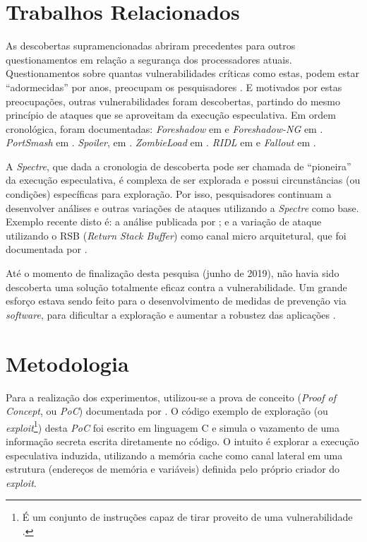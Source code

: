 \documentclass[conference]{IEEEtran}
\begin{document}
\section{Trabalhos Relacionados}
As descobertas supramencionadas abriram precedentes para outros questionamentos em relação a segurança dos processadores atuais. Questionamentos sobre quantas vulnerabilidades críticas como estas, podem estar ``adormecidas'' por anos, preocupam os pesquisadores \cite{Andy2018Triple}. E motivados por estas preocupações, outras vulnerabilidades foram descobertas, partindo do mesmo princípio de ataques que se aproveitam da execução especulativa. Em ordem cronológica, foram documentadas: \emph{Foreshadow} em  e \emph{Foreshadow-NG} em . \emph{PortSmash} em . \emph{Spoiler}, em . \emph{ZombieLoad} em . \emph{RIDL} em  e \emph{Fallout} em .

A \emph{Spectre}, que dada a cronologia de descoberta pode ser chamada de ``pioneira'' da execução especulativa, é complexa de ser explorada e possui circunstâncias (ou condições) específicas para exploração. Por isso, pesquisadores continuam a desenvolver análises e outras variações de ataques utilizando a \emph{Spectre} como base. Exemplo recente disto é: a análise publicada por ; e a variação de ataque utilizando o RSB (\emph{Return Stack Buffer}) como canal micro arquitetural, que foi documentada por .

Até o momento de finalização desta pesquisa (junho de 2019), não havia sido descoberta uma solução totalmente eficaz contra a vulnerabilidade. Um grande esforço estava sendo feito para o desenvolvimento de medidas de prevenção via \emph{software}, para dificultar a exploração e aumentar a robustez das aplicações \cite{Graz2018Meltdown}.

\section{Metodologia}
Para a realização dos experimentos, utilizou-se a prova de conceito (\emph{Proof of Concept}, ou \emph{PoC}) documentada por . O código exemplo de exploração (ou \emph{exploit}\footnote{É um conjunto de instruções \cite{Cruz2016Estudo} capaz de tirar proveito de uma vulnerabilidade \cite{Cambridge2019Exploit}.}) desta \emph{PoC} foi escrito em linguagem C e simula o vazamento de uma informação secreta escrita diretamente no código. O intuito é explorar a execução especulativa induzida, utilizando a memória cache como canal lateral em uma estrutura (endereços de memória e variáveis) definida pelo próprio criador do \emph{exploit}. 
\end{document}
